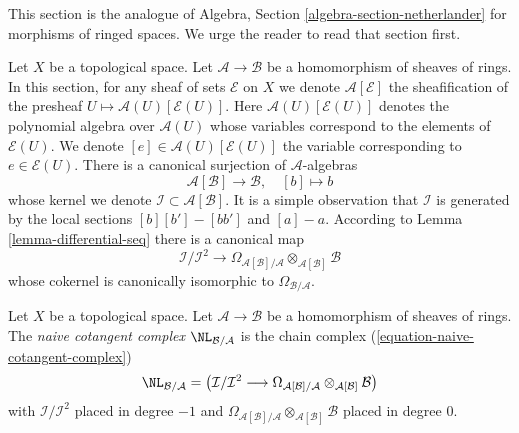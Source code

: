 \noindent
This section is the analogue of
Algebra, Section \ref{algebra-section-netherlander} for morphisms of ringed
spaces. We urge the reader to read that section first.

\medskip\noindent
Let $X$ be a topological space. Let $\mathcal{A} \to \mathcal{B}$ be a
homomorphism of sheaves of rings. In this section, for any sheaf of sets
$\mathcal{E}$ on $X$ we denote $\mathcal{A}[\mathcal{E}]$ the sheafification
of the presheaf $U \mapsto \mathcal{A}(U)[\mathcal{E}(U)]$. Here
$\mathcal{A}(U)[\mathcal{E}(U)]$
denotes the polynomial algebra over $\mathcal{A}(U)$
whose variables correspond to the elements of $\mathcal{E}(U)$.
We denote $[e] \in \mathcal{A}(U)[\mathcal{E}(U)]$ the variable
corresponding to $e \in \mathcal{E}(U)$.
There is a canonical surjection of $\mathcal{A}$-algebras
\begin{equation}
\label{equation-canonical-presentation}
\mathcal{A}[\mathcal{B}] \longrightarrow \mathcal{B},\quad [b] \longmapsto b
\end{equation}
whose kernel we denote $\mathcal{I} \subset \mathcal{A}[\mathcal{B}]$.
It is a simple observation that $\mathcal{I}$ is generated by the
local sections $[b][b'] - [bb']$ and $[a] - a$. According to
Lemma \ref{lemma-differential-seq} there is a canonical map
\begin{equation}
\label{equation-naive-cotangent-complex}
\mathcal{I}/\mathcal{I}^2
\longrightarrow
\Omega_{\mathcal{A}[\mathcal{B}]/\mathcal{A}}
\otimes_{\mathcal{A}[\mathcal{B}]} \mathcal{B}
\end{equation}
whose cokernel is canonically isomorphic to $\Omega_{\mathcal{B}/\mathcal{A}}$.

\begin{definition}
\label{definition-naive-cotangent-complex}
Let $X$ be a topological space. Let $\mathcal{A} \to \mathcal{B}$ be a
homomorphism of sheaves of rings. The {\it naive cotangent complex}
$\NL_{\mathcal{B}/\mathcal{A}}$ is the chain complex
(\ref{equation-naive-cotangent-complex})
$$
\NL_{\mathcal{B}/\mathcal{A}} =
\left(\mathcal{I}/\mathcal{I}^2
\longrightarrow
\Omega_{\mathcal{A}[\mathcal{B}]/\mathcal{A}}
\otimes_{\mathcal{A}[\mathcal{B}]} \mathcal{B}\right)
$$
with $\mathcal{I}/\mathcal{I}^2$ placed in degree $-1$ and
$\Omega_{\mathcal{A}[\mathcal{B}]/\mathcal{A}}
\otimes_{\mathcal{A}[\mathcal{B}]} \mathcal{B}$
placed in degree $0$.
\end{definition}

